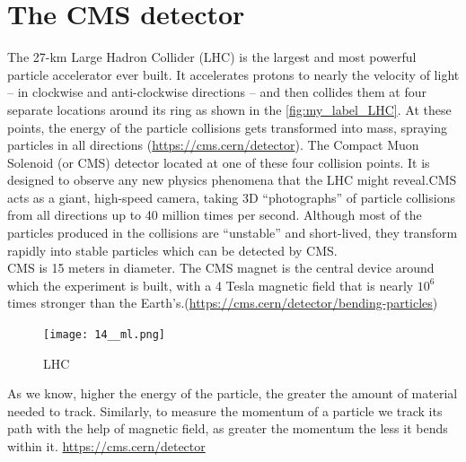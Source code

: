 \chapter{\label{The CMS detector}The CMS detector}
The 27-km Large Hadron Collider (LHC) is the largest and most powerful particle accelerator ever built. It accelerates protons to nearly the velocity of light -- in clockwise and anti-clockwise directions -- and then collides them at four separate locations around its ring as shown in the \autoref{fig:my_label_LHC}. At these points, the energy of the particle collisions gets transformed into mass, spraying particles in all directions (\url{https://cms.cern/detector}).
The Compact Muon Solenoid (or CMS) detector located at one of these four collision points. It is designed to observe any new physics phenomena that the LHC might reveal.CMS acts as a giant, high-speed camera, taking 3D “photographs” of particle collisions from all directions up to 40 million times per second. Although most of the particles produced in the collisions are “unstable” and short-lived, they transform rapidly into stable particles which can be detected by CMS.\\
 CMS is 15 meters in diameter. The CMS magnet is the central device around which the experiment is built, with a 4 Tesla magnetic field that is nearly $10^6$ times stronger than the Earth’s.(\url{https://cms.cern/detector/bending-particles})
 \begin{figure}[H]
     \centering
     \texttt{[image: 14\_\_ml.png]}
     \caption{LHC}
     \label{fig:my_label_LHC}
 \end{figure}
As we know, higher the energy of the particle, the greater the amount of material needed to track. Similarly, to measure the momentum of a particle we track its path with the help of magnetic field, as greater the momentum the less it bends within it.
\url{https://cms.cern/detector}\\



